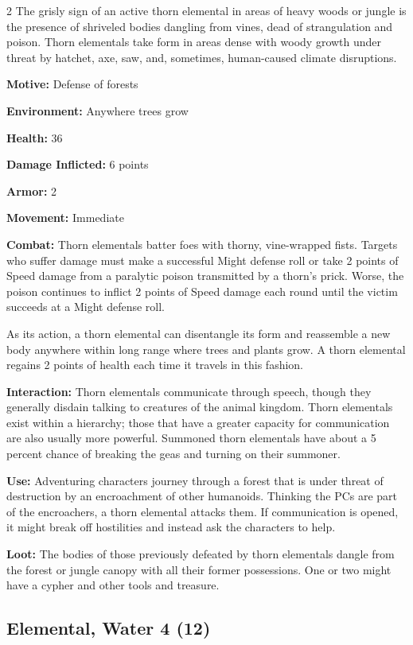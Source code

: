 \begin{multicols}{2}
The grisly sign of an active thorn elemental in areas of heavy woods or jungle is the presence of shriveled bodies dangling from vines, dead of strangulation and poison. Thorn elementals take form in areas dense with woody growth under threat by hatchet, axe, saw, and, sometimes, human-caused climate disruptions. 

\textbf{Motive:} Defense of forests 

\textbf{Environment:} Anywhere trees grow 

\textbf{Health:} 36 

\textbf{Damage Inflicted:} 6 points 

\textbf{Armor:} 2 

\textbf{Movement:} Immediate 

\textbf{Combat:} Thorn elementals batter foes with thorny, vine-wrapped fists. Targets who suffer damage must make a successful Might defense roll or take 2 points of Speed damage from a paralytic poison transmitted by a thorn’s prick. Worse, the poison continues to inflict 2 points of Speed damage each round until the victim succeeds at a Might defense roll. 

As its action, a thorn elemental can disentangle its form and reassemble a new body anywhere within long range where trees and plants grow. A thorn elemental regains 2 points of health each time it travels in this fashion. 

\textbf{Interaction:} Thorn elementals communicate through speech, though they generally disdain talking to creatures of the animal kingdom. Thorn elementals exist within a hierarchy; those that have a greater capacity for communication are also usually more powerful. Summoned thorn elementals have about a 5 percent chance of breaking the geas and turning on their summoner. 

\textbf{Use:} Adventuring characters journey through a forest that is under threat of destruction by an encroachment of other humanoids. Thinking the PCs are part of the encroachers, a thorn elemental attacks them. If communication is opened, it might break off hostilities and instead ask the characters to help. 

\textbf{Loot:} The bodies of those previously defeated by thorn elementals dangle from the forest or jungle canopy with all their former possessions. One or two might have a cypher and other tools and treasure.

\subsection{Elemental, Water 4 (12)}


\end{multicols}

